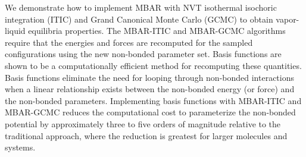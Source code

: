 \documentclass[11pt,a4paper]{article}
\begin{document}
	We demonstrate how to implement MBAR with NVT isothermal isochoric integration (ITIC) and Grand Canonical Monte Carlo (GCMC) to obtain vapor-liquid equilibria properties. The MBAR-ITIC and MBAR-GCMC algorithms require that the energies and forces are recomputed for the sampled configurations using the new non-bonded parameter set. Basis functions are shown to be a computationally efficient method for recomputing these quantities. Basis functions eliminate the need for looping through non-bonded interactions when a linear relationship exists between the non-bonded energy (or force) and the non-bonded parameters. Implementing basis functions with MBAR-ITIC and MBAR-GCMC reduces the computational cost to parameterize the non-bonded potential by approximately three to five orders of magnitude relative to the traditional approach, where the reduction is greatest for larger molecules and systems.
	
	
	 
	 
	
\end{document}

